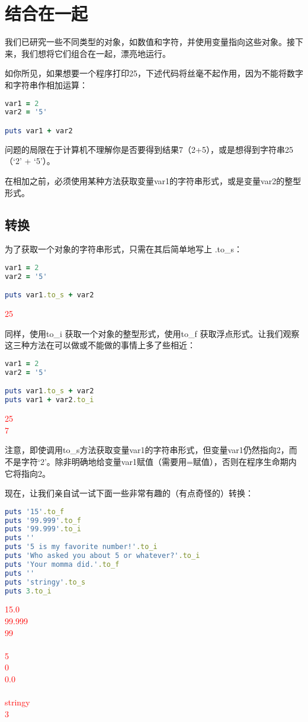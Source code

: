 \chapter{结合在一起}

我们已研究一些不同类型的对象，如数值和字符，并使用变量指向这些对象。接下来，我们想将它们组合在一起，漂亮地运行。

如你所见，如果想要一个程序打印25，下述代码将丝毫不起作用，因为不能将数字和字符串作相加运算：

\begin{lstlisting}[language=ruby]
var1 = 2
var2 = '5'

puts var1 + var2
\end{lstlisting}

问题的局限在于计算机不理解你是否要得到结果7（2+5），或是想得到字符串25（`2' + `5'）。

在相加之前，必须使用某种方法获取变量var1的字符串形式，或是变量var2的整型形式。

\section{转换}

为了获取一个对象的字符串形式，只需在其后简单地写上 .to\_s：

\begin{lstlisting}[language=ruby]
var1 = 2
var2 = '5'

puts var1.to_s + var2
\end{lstlisting}
\textcolor{red}{
25
}

同样，使用to\_i 获取一个对象的整型形式，使用to\_f 获取浮点形式。让我们观察这三种方法在可以做或不能做的事情上多了些相近：
\begin{lstlisting}[language=ruby]
var1 = 2
var2 = '5'

puts var1.to_s + var2
puts var1 + var2.to_i
\end{lstlisting}
\textcolor{red}{
25\\
7
}

注意，即使调用to\_s方法获取变量var1的字符串形式，但变量var1仍然指向2，而不是字符`2'。除非明确地给变量var1赋值（需要用=赋值），否则在程序生命期内它将指向2。

现在，让我们亲自试一试下面一些非常有趣的（有点奇怪的）转换：

\begin{lstlisting}[language=ruby]
puts '15'.to_f
puts '99.999'.to_f
puts '99.999'.to_i
puts ''
puts '5 is my favorite number!'.to_i
puts 'Who asked you about 5 or whatever?'.to_i
puts 'Your momma did.'.to_f
puts ''
puts 'stringy'.to_s
puts 3.to_i
\end{lstlisting}
\textcolor{red}{
15.0 \\
99.999 \\
99 \\
\\
5 \\
0 \\
0.0 \\
\\
stringy \\
3
}

